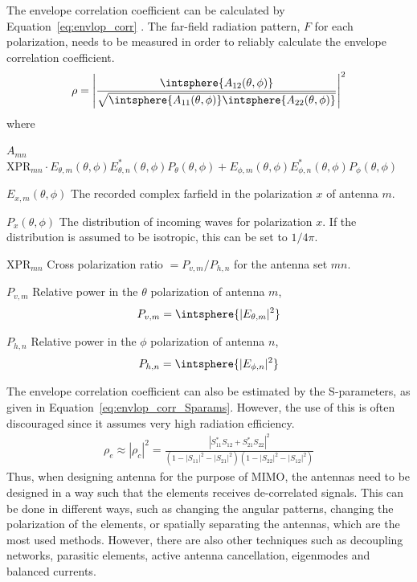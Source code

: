 The envelope correlation coefficient can be calculated by Equation~\ref{eq:envlop_corr} \cite{Wang2010}. The far-field radiation pattern, $F$ for each polarization, needs to be measured in order to reliably calculate the envelope correlation coefficient.
\begin{align} 
\label{eq:envlop_corr}
\rho = 
\left|  
%
\frac
{\intsphere{A_{12}(\theta,\phi)}}
{\sqrt{\intsphere{A_{11}(\theta,\phi)} \intsphere{A_{22}(\theta,\phi)}}}
%
\right|^2
\end{align}
where
\def\xpr{\text{XPR}}
\begin{where}
\item[$A_{mn}$]
    $
    \xpr_{mn} \cdot E_{\theta,m}(\theta,\phi) E^*_{\theta,n}(\theta,\phi) P_{\theta}(\theta,\phi)
    +
    E_{\phi,m}(\theta,\phi)E^*_{\phi,n}(\theta,\phi)P_{\phi}(\theta,\phi)
    $
\item[$E_{x,m}(\theta,\phi)$] The recorded complex farfield in the polarization $x$ of antenna $m$.
\item[$P_x(\theta,\phi)$] The distribution of incoming waves for polarization $x$. If the distribution is assumed to be isotropic, this can be set to $1/4\pi$.
\item[$\xpr_{mn}$] Cross polarization ratio $= P_{v,m}/P_{h,n}$ for the antenna set $mn$.
\item[$P_{v,m}$] Relative power in the $\theta$ polarization of antenna $m$, 
    \begin{equation*}
        P_{v,m} = \intsphere{|E_{\theta,m}|^2}
    \end{equation*}
\item[$P_{h,n}$] Relative power in the $\phi$ polarization of antenna $n$,
    \begin{equation*}
        P_{h,n} = \intsphere{|E_{\phi,n}|^2}
    \end{equation*}
\end{where}

The envelope correlation coefficient can also be estimated by the S-parameters, as given in Equation~\ref{eq:envlop_corr_Sparams}\cite{Alain2010MIMO}. However, the use of this is often discouraged since it assumes very high radiation efficiency\cite{Alain2010MIMO}.
\begin{align}
\label{eq:envlop_corr_Sparams}
  \rho_e \approx |\rho_c|^2 = \frac{|S^*_{11}S_{12}+S^*_{21}S_{22}|^2}{(1-|S_{11}|^2-|S_{21}|^2)(1-|S_{22}|^2-|S_{12}|^2)}
\end{align}
Thus, when designing antenna for the purpose of MIMO, the antennas need to be designed in a way such that the elements receives de-correlated signals. This can be done in different ways, such as changing the angular patterns, changing the polarization of the elements, or spatially separating the antennas, which are the most used methods. However, there are also other techniques such as decoupling networks, parasitic elements, active antenna cancellation, eigenmodes and balanced currents. 


